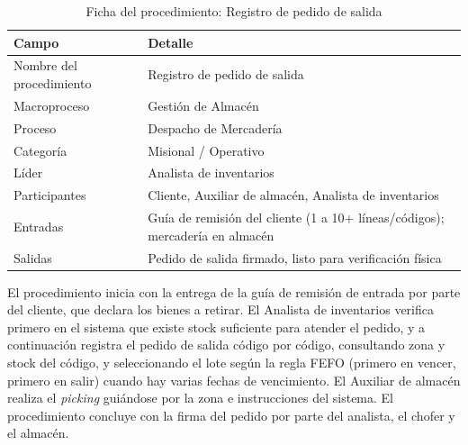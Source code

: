 \documentclass[11pt, a4paper, oneside]{report}
\begin{document}
\begin{table}[H]
\centering\small
\renewcommand{\arraystretch}{1.25}
\setlength{\tabcolsep}{6pt}
\begin{tabularx}{\textwidth}{|>{\raggedright\arraybackslash}p{}|>{\raggedright\arraybackslash}X|}
\hline
\rowcolor{upeu_mid}
\color{white}\bfseries Campo & \color{white}\bfseries Detalle \\ \hline
\rowcolor{gray!10}
Nombre del procedimiento & Registro de pedido de salida \\ \hline
\rowcolor{gray!10}
Macroproceso & Gestión de Almacén \\ \hline
Proceso & Despacho de Mercadería \\ \hline
\rowcolor{gray!10}
Categoría & Misional / Operativo \\ \hline
Líder & Analista de inventarios \\ \hline
\rowcolor{gray!10}
Participantes & Cliente, Auxiliar de almacén, Analista de inventarios \\ \hline
Entradas & Guía de remisión del cliente (1 a 10+ líneas/códigos); mercadería en almacén \\ \hline
\rowcolor{gray!10}
Salidas & Pedido de salida firmado, listo para verificación física \\ \hline
\end{tabularx}
\caption{Ficha del procedimiento: Registro de pedido de salida}
\end{table}

El procedimiento inicia con la entrega de la guía de remisión de entrada por parte del cliente, que declara los bienes a retirar. El Analista de inventarios verifica primero en el sistema que existe stock suficiente para atender el pedido, y a continuación registra el pedido de salida código por código, consultando zona y stock del código, y seleccionando el lote según la regla FEFO (primero en vencer, primero en salir) cuando hay varias fechas de vencimiento. El Auxiliar de almacén realiza el \textit{picking} guiándose por la zona e instrucciones del sistema. El procedimiento concluye con la firma del pedido por parte del analista, el chofer y el almacén.
\end{document}
